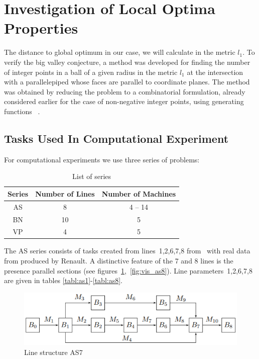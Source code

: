 \documentclass{ifacconf}
\begin{document}
\section{Investigation of Local Optima Properties} \label{investigation}

The distance to global optimum
in our case, we will calculate in the metric $l_1$.
To verify the big valley conjecture, a method was developed
for finding the number of integer points in
a ball of a given radius in the metric $l_1$ at the intersection with a parallelepiped
whose faces are parallel to coordinate planes.
The method
was obtained by reducing the problem to a combinatorial
formulation, already considered earlier for the case of non-negative
integer points, using
generating functions ~\cite{Sach}.

\subsection{Tasks Used In Computational Experiment}\label{subsec:tasks}
For computational experiments we use three series of problems:
\begin{table}[!ht]
\centering
\small
\begin{tabular}{|c|c|c|}
\hline
Series&Number of Lines&Number of Machines\\
\hline
AS & 8 & 4 -- 14 \\
BN & 10 & 5 \\
VP & 4 & 5 \\
\hline
\end{tabular}
\caption{List of series}\label{tabl:series}
\vspace{-0.5cm}
\end{table}

The AS series consists of tasks created from lines~1,2,6,7,8 from~\cite{Ancelin1987} with real data from
produced by Renault.
A distinctive feature of the 7 and 8 lines is the presence
parallel sections (see figures~\ref{fig:vis_as7},~\ref{fig:vis_as8}).
Line parameters~1,2,6,7,8 are given in tables \ref{tabl:as1}-\ref{tabl:as8}.

 \begin{figure}[h!]
	\centering
	\includegraphics[scale=0.6]{ans7}
  \caption{Line structure AS7} \label{fig:vis_as7}
  \end{figure}
\end{document}

